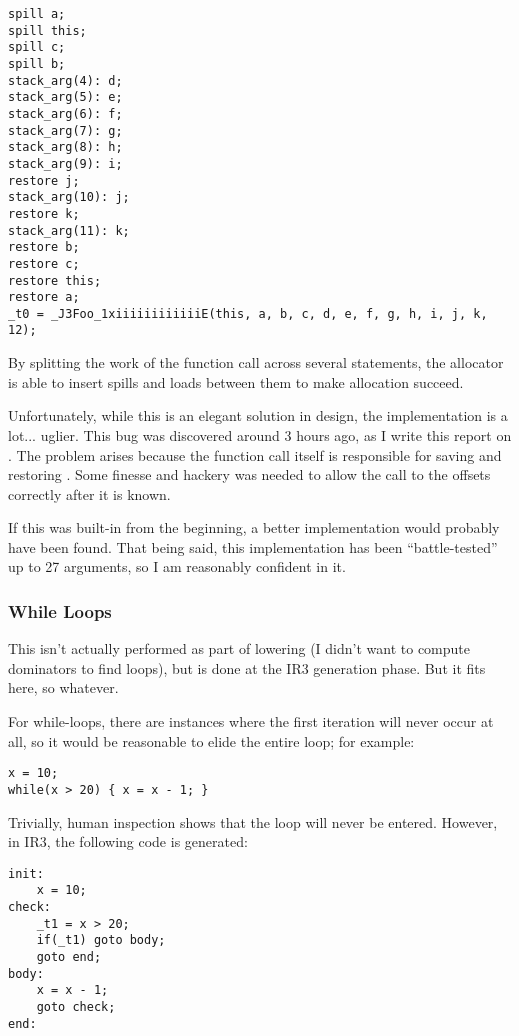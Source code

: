 \documentclass[12pt]{article}
\begin{document}
\begin{verbatim}
spill a;
spill this;
spill c;
spill b;
stack_arg(4): d;
stack_arg(5): e;
stack_arg(6): f;
stack_arg(7): g;
stack_arg(8): h;
stack_arg(9): i;
restore j;
stack_arg(10): j;
restore k;
stack_arg(11): k;
restore b;
restore c;
restore this;
restore a;
_t0 = _J3Foo_1xiiiiiiiiiiiiE(this, a, b, c, d, e, f, g, h, i, j, k, 12);
\end{verbatim}

By splitting the work of the function call across several statements, the allocator is able to insert spills and
loads between them to make allocation succeed.

Unfortunately, while this is an elegant solution in design, the implementation is a lot... uglier. This bug was
discovered around 3 hours ago, as I write this report on . The problem arises because the
function call itself is responsible for saving and restoring . Some finesse and hackery was needed to
allow the call to  the offsets correctly after it is known.

If this was built-in from the beginning, a better implementation would probably have been found. That being said,
this implementation has been \enquote{battle-tested} up to 27 arguments, so I am reasonably confident in it.




\subsubsection{While Loops}

This isn't actually performed as part of lowering (I didn't want to compute dominators to find loops), but is done
at the IR3 generation phase. But it fits here, so whatever.

For while-loops, there are instances where the first iteration will never occur at all, so it would be reasonable
to elide the entire loop; for example:

\begin{verbatim}
x = 10;
while(x > 20) { x = x - 1; }
\end{verbatim}

Trivially, human inspection shows that the loop will never be entered. However, in IR3, the following code is generated:

\begin{verbatim}
init:
	x = 10;
check:
	_t1 = x > 20;
	if(_t1) goto body;
	goto end;
body:
	x = x - 1;
	goto check;
end:
\end{verbatim}
\end{document}

